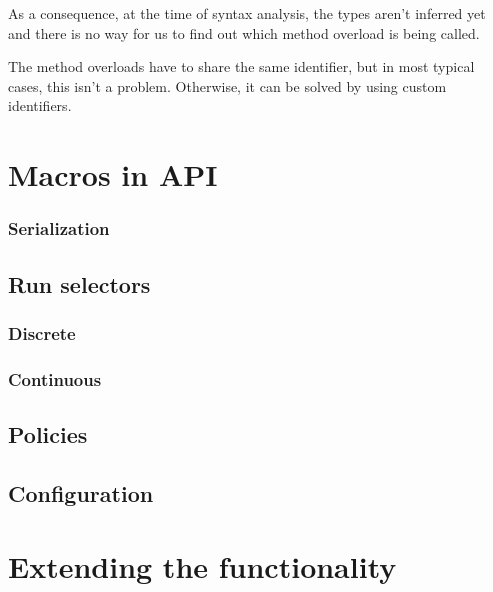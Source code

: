 As a consequence, at the time of syntax analysis, the types aren't inferred yet and there is no way for us to find out which method overload is being called.

The method overloads have to share the same identifier, but in most typical cases, this isn't a problem. Otherwise, it can be solved by using custom identifiers.
	
\section{Macros in API}


\subsubsection{Serialization}
\subsection{Run selectors}
\subsubsection{Discrete}
\subsubsection{Continuous}
\subsection{Policies}
\subsection{Configuration}

\section{Extending the functionality}
